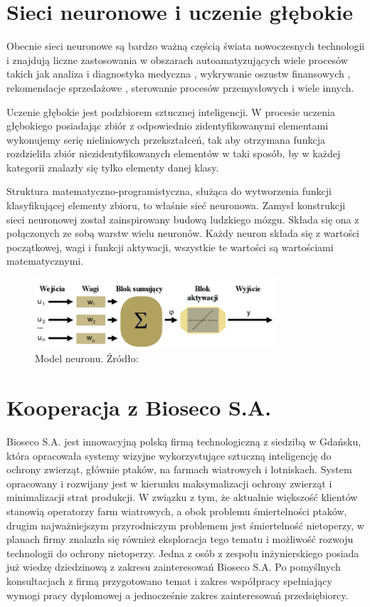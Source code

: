 \documentclass{sprz}
\begin{document}
\section{Sieci neuronowe i uczenie głębokie}
Obecnie sieci neuronowe są bardzo ważną częścią świata nowoczesnych 
technologii i znajdują liczne zastosowania w obszarach autoamatyzujących 
wiele procesów takich jak analiza i diagnostyka medyczna \cite{diabetes}, 
wykrywanie oszustw finansowych \cite{laundring}, rekomendacje sprzedażowe 
\cite{fashion}, sterowanie procesów przemysłowych \cite{irigation} i wiele innych.

Uczenie głębokie jest podzbiorem sztucznej inteligencji. W procesie uczenia
głębokiego posiadając zbiór z odpowiednio zidentyfikowanymi elementami wykonujemy
serię nieliniowych przekształceń, tak aby otrzymana funkcja rozdzieliła zbiór 
niezidentyfikowanych elementów w taki sposób, by w każdej kategorii znalazły się 
tylko elementy danej klasy.

Struktura matematyczno-programistyczna, służąca do wytworzenia funkcji
klasyfikującej elementy zbioru, to właśnie sieć neuronowa. Zamysł konstrukcji
sieci neuronowej został zainspirowany budową ludzkiego mózgu. Składa się ona
z połączonych ze sobą warstw wielu neuronów. Każdy neuron składa się z 
wartości początkowej, wagi i funkcji aktywacji, wszystkie te wartości są 
wartościami matematycznymi. 

\begin{figure}[h]
  \centering
  \includegraphics[width=0.8\textwidth]{sprz/neuron}
  \caption{Model neuronu. Źródło: \cite{neuron}}
  \label{img:neuron}
\end{figure} 

\section{Kooperacja z Bioseco S.A.}
Bioseco S.A. jest innowacyjną polską firmą technologiczną z siedzibą w Gdańsku, która opracowała systemy wizyjne wykorzystujące sztuczną inteligencję do ochrony zwierząt, głównie ptaków, na farmach wiatrowych i lotniskach. System opracowany i rozwijany jest w kierunku maksymalizacji ochrony zwierząt i minimalizacji strat produkcji. W związku z tym, że aktualnie większość klientów stanowią operatorzy farm wiatrowych, a obok problemu śmiertelności ptaków, drugim najważniejszym przyrodniczym problemem jest śmiertelność nietoperzy, w planach firmy znalazła się również eksploracja tego tematu i możliwość rozwoju technologii do ochrony nietoperzy. Jedna z osób z zespołu inżynierskiego posiada już wiedzę dziedzinową z zakresu zainteresowań Bioseco S.A. Po pomyślnych konsultacjach z firmą przygotowano temat i zakres współpracy spełniający wymogi pracy dyplomowej a jednocześnie zakres zainteresowań przedsiębiorcy.
\end{document}
